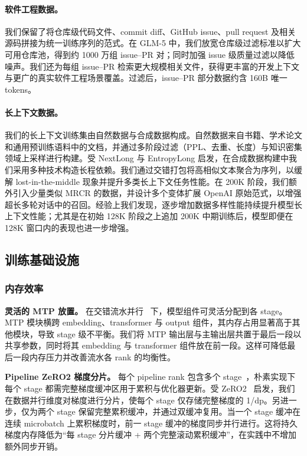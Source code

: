 \paragraph{软件工程数据。} 我们保留了将仓库级代码文件、commit diff、GitHub issue、pull request 及相关源码拼接为统一训练序列的范式。在 GLM-5 中，我们放宽仓库级过滤标准以扩大可用仓库池，得到约 1000 万组 issue–PR 对；同时加强 issue 级质量过滤以降低噪声。我们还为每组 issue–PR 检索更大规模相关文件，获得更丰富的开发上下文与更广的真实软件工程场景覆盖。过滤后，issue–PR 部分数据约含 160B 唯一 tokens。

\paragraph{长上下文数据。} 我们的长上下文训练集由自然数据与合成数据构成。自然数据来自书籍、学术论文和通用预训练语料中的文档，并通过多阶段过滤（PPL、去重、长度）与知识密集领域上采样进行构建。受 NextLong\cite{gao2025nextlongeffectivelongcontexttraining} 与 EntropyLong\cite{jia2025entropylongeffectivelongcontexttraining} 启发，在合成数据构建中我们采用多种技术构造长程依赖。我们通过交错打包将高相似文本聚合为序列，以缓解 lost-in-the-middle 现象并提升多类长上下文任务性能。在 200K 阶段，我们额外引入少量类似 MRCR 的数据，并设计多个变体扩展 OpenAI 原始范式，以增强超长多轮对话中的召回。经验上我们发现，逐步增加数据多样性能持续提升模型长上下文性能；尤其是在初始 128K 阶段之上追加 200K 中期训练后，模型即便在 128K 窗口内的表现也进一步增强。

\subsection{训练基础设施}

\subsubsection{内存效率}

\textbf{灵活的 MTP 放置。} 在交错流水并行~\cite{narayanan2021efficientlargescalelanguagemodel} 下，模型组件可灵活分配到各 stage。MTP 模块横跨 embedding、transformer 与 output 组件，其内存占用显著高于其他模块，导致 stage 级不平衡。我们将 MTP 输出层与主输出层共置于最后一段以共享参数，同时将其 embedding 与 transformer 组件放在前一段。这样可降低最后一段内存压力并改善流水各 rank 的均衡性。

\textbf{Pipeline ZeRO2 梯度分片。} 每个 pipeline rank 包含多个 stage~\cite{narayanan2021efficientlargescalelanguagemodel}，朴素实现下每个 stage 都需完整梯度缓冲区用于累积与优化器更新。受 ZeRO2~\cite{rajbhandari2020zeromemoryoptimizationstraining} 启发，我们在数据并行维度对梯度进行分片，使每个 stage 仅存储完整梯度的 1/dp。另进一步，仅为两个 stage 保留完整累积缓冲，并通过双缓冲复用。当一个 stage 缓冲在连续 microbatch 上累积梯度时，前一 stage 缓冲的梯度同步并行进行。这将持久梯度内存降低为“每 stage 分片缓冲 + 两个完整滚动累积缓冲”，在实践中不增加额外同步开销。

